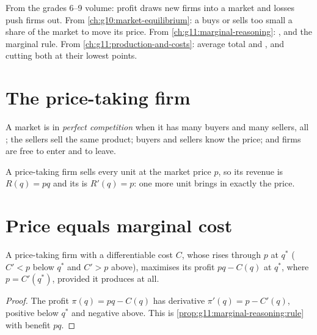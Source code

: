 \begin{recall}
From the grades 6--9 volume: profit draws new firms into a market and losses push firms out. From \cref{ch:g10:market-equilibrium}: a \emph{} buys or sells too small a share of the market to move its price. From \cref{ch:g11:marginal-reasoning}: ,  and the
marginal rule. From \cref{ch:g11:production-and-costs}: average total and , and  cutting both at their lowest points.
\end{recall}

\section{The price-taking firm}\label{sec:g11:perfect-competition:price-taker}

\begin{definition}\label{def:g11:perfect-competition:perfect-competition}
A market is in \emph{perfect competition} when it has many buyers and many sellers, all ; the sellers sell the same
product; buyers and sellers know the price; and firms are free to enter and to leave.
\end{definition}

A price-taking firm sells every unit at the market price $p$, so its revenue is $R(q) = pq$ and its  is $R'(q) = p$: one more unit brings in
exactly the price.

\section{Price equals marginal cost}\label{sec:g11:perfect-competition:p-mc}

\begin{proposition}\label{prop:g11:perfect-competition:p-mc}
A price-taking firm with a differentiable cost $C$, whose  rises through $p$ at $q^*$ ($C' < p$ below $q^*$ and $C' > p$ above), maximises its
profit $pq - C(q)$ at $q^*$, where $p = C'(q^*)$, provided it produces at all.
\end{proposition}
\begin{proof}
The profit $\pi(q) = pq - C(q)$ has derivative $\pi'(q) = p - C'(q)$, positive below $q^*$ and negative above. This is \cref{prop:g11:marginal-reasoning:rule}
with benefit $pq$.
\end{proof}

